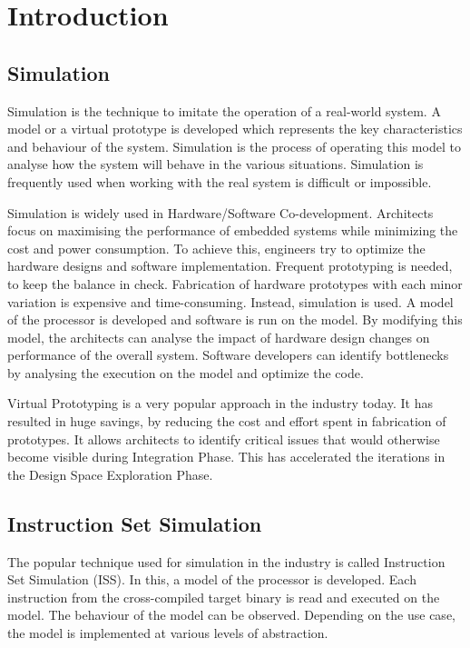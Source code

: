 \chapter{Introduction}\label{chapter:introduction}

\section{Simulation}

Simulation is the technique to imitate the operation of a real-world system. 
A model or a virtual prototype is developed which represents the key characteristics and behaviour of the system. Simulation is the process of operating this model to analyse how the system will behave in the various situations. Simulation is frequently used when working with the real system is difficult or impossible.

Simulation is widely used in Hardware/Software Co-development. Architects focus on maximising the performance of embedded systems while minimizing the cost and power consumption. To achieve this, engineers try to optimize the hardware designs and software implementation. Frequent prototyping is needed, to keep the balance in check. Fabrication of hardware prototypes with each minor variation is expensive and time-consuming. Instead, simulation is used. A model of the processor is developed and software is run on the model. By modifying this model, the architects can analyse the impact of hardware design changes on performance of the overall system. Software developers can identify bottlenecks by analysing the execution on the model and optimize the code. 

Virtual Prototyping is a very popular approach in the industry today. It has resulted in huge savings, by reducing the cost and effort spent in fabrication of prototypes. It allows architects to identify critical issues that would otherwise become visible during Integration Phase. This has accelerated the iterations in the Design Space Exploration Phase. 

\section{Instruction Set Simulation}

The popular technique used for simulation in the industry is called Instruction Set Simulation (ISS). In this, a model of the processor is developed. Each instruction from the cross-compiled target binary is read and executed on the model. The behaviour of the model can be observed. Depending on the use case, the model is implemented at various levels of abstraction. 


